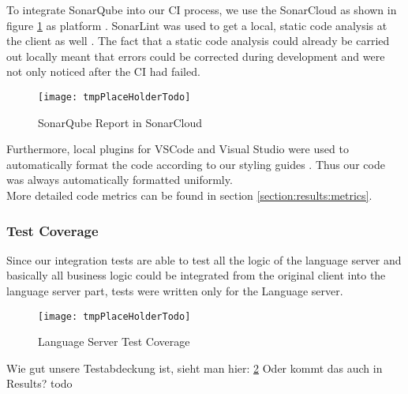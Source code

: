 To integrate SonarQube into our CI process, we use the SonarCloud as shown in figure \ref{fig:sonarcloud_report}
as platform \cite{sonarcloud}.
SonarLint was used to get a local, static code analysis at the client as well \cite{sonar-lint}.
The fact that a static code analysis could already be carried out locally meant that errors
could be corrected during development and were not only noticed after the CI had failed.

\begin{figure}[H]
    \centering
    \texttt{[image: tmpPlaceHolderTodo]}
    \caption{SonarQube Report in SonarCloud}
    \label{fig:sonarcloud_report}
\end{figure}

Furthermore, local plugins for VSCode and Visual Studio were used to automatically
format the code according to our styling guides \cite{dev}.
Thus our code was always automatically formatted uniformly. \\

More detailed code metrics can be found in section \ref{section:results:metrics}.

\subsubsection{Test Coverage}
Since our integration tests are able to test all the logic of the language server
and basically all business logic could be integrated from the original client into the language server part,
tests were written only for the Language server.

\begin{figure}[H]
    \centering
    \texttt{[image: tmpPlaceHolderTodo]}
    \caption{Language Server Test Coverage}
    \label{fig:test_coverage}
\end{figure}

Wie gut unsere Testabdeckung ist, sieht man hier: \ref{fig:test_coverage}
Oder kommt das auch in Results? todo
